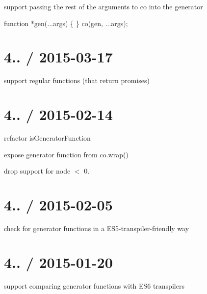 
\begin{DoxyItemize}
\item support passing the rest of the arguments to co into the generator
\end{DoxyItemize}


\begin{DoxyCode}
function *gen(...args) \{ \}
co(gen, ...args);
\end{DoxyCode}


\section*{4.. / 2015-\/03-\/17 }


\begin{DoxyItemize}
\item support regular functions (that return promises)
\end{DoxyItemize}

\section*{4.. / 2015-\/02-\/14 }


\begin{DoxyItemize}
\item refactor {\ttfamily is\+Generator\+Function}
\item expose generator function from {\ttfamily co.\+wrap()}
\item drop support for node $<$ 0.
\end{DoxyItemize}

\section*{4.. / 2015-\/02-\/05 }


\begin{DoxyItemize}
\item check for generator functions in a E\+S5-\/transpiler-\/friendly way
\end{DoxyItemize}

\section*{4.. / 2015-\/01-\/20 }


\begin{DoxyItemize}
\item support comparing generator functions with E\+S6 transpilers
\end{DoxyItemize}

